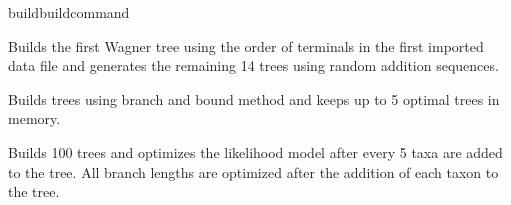 \begin{command}{build}{buildcommand}
\begin{poyexamples}
            {Builds the first Wagner tree using the order of terminals in the first
            imported data file and generates the remaining
            14 trees using random addition sequences.}
            
            {Builds trees using branch and bound method and keeps up to
            5 optimal trees in memory.}
            
            {Builds 100 trees and optimizes the likelihood model after every 5 
            taxa are added to the tree.  All branch lengths are optimized after the addition 
            of each taxon to the tree.}
                    
    \end{poyexamples}

\end{command}




